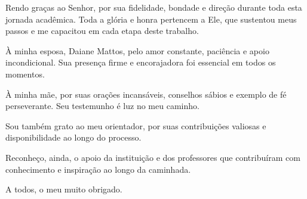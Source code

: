 \newpage


\vspace{2cm}

\justifying
Rendo graças ao Senhor, por sua fidelidade, bondade e direção durante toda esta jornada acadêmica. Toda a glória e honra pertencem a Ele, que sustentou meus passos e me capacitou em cada etapa deste trabalho.

À minha esposa, Daiane Mattos, pelo amor constante, paciência e apoio incondicional. Sua presença firme e encorajadora foi essencial em todos os momentos.

À minha mãe, por suas orações incansáveis, conselhos sábios e exemplo de fé perseverante. Seu testemunho é luz no meu caminho.

Sou também grato ao meu orientador, por suas contribuições valiosas e disponibilidade ao longo do processo.

Reconheço, ainda, o apoio da instituição e dos professores que contribuíram com conhecimento e inspiração ao longo da caminhada.

A todos, o meu muito obrigado.
